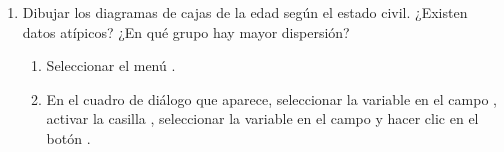 \begin{enumerate}[leftmargin=*]
\begin{enumerate}
\item Dibujar los diagramas de cajas de la edad según el estado civil. ¿Existen datos atípicos? ¿En qué grupo hay mayor
dispersión?
\begin{indicacion}{
\begin{enumerate}
\item Seleccionar el menú .
\item En el cuadro de diálogo que aparece, seleccionar la variable  en el campo ,
activar la casilla , seleccionar la variable  en el campo
 y hacer clic en el botón .
\end{enumerate}}
\end{indicacion}
\end{enumerate}

\end{enumerate}


